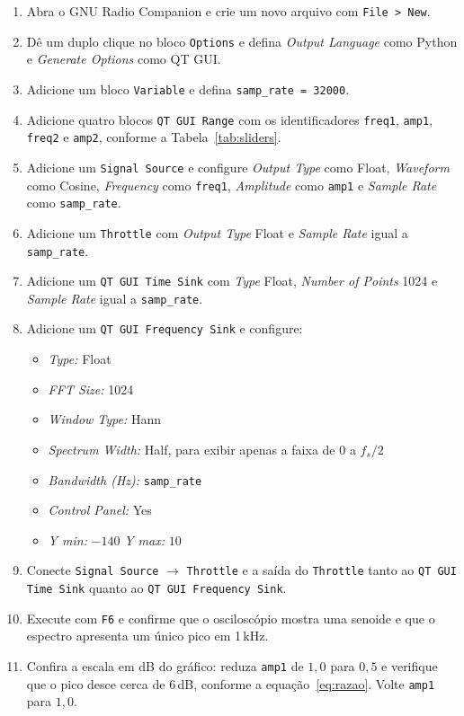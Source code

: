 \documentclass[11pt,a4paper]{article}
\begin{document}
\begin{instrucao}
\begin{enumerate}[label=\arabic*.]
  \item Abra o GNU Radio Companion e crie um novo arquivo com
    \texttt{File > New}.
  \item Dê um duplo clique no bloco \texttt{Options} e defina
    \textit{Output Language} como Python e \textit{Generate Options} como
    QT GUI.
  \item Adicione um bloco \texttt{Variable} e defina
    \texttt{samp\_rate = 32000}.
  \item Adicione quatro blocos \texttt{QT GUI Range} com os identificadores
    \texttt{freq1}, \texttt{amp1}, \texttt{freq2} e \texttt{amp2}, conforme a
    Tabela~\ref{tab:sliders}.
  \item Adicione um \texttt{Signal Source} e configure
    \textit{Output Type} como Float, \textit{Waveform} como Cosine,
    \textit{Frequency} como \texttt{freq1}, \textit{Amplitude} como
    \texttt{amp1} e \textit{Sample Rate} como \texttt{samp\_rate}.
  \item Adicione um \texttt{Throttle} com \textit{Output Type} Float e
    \textit{Sample Rate} igual a \texttt{samp\_rate}.
  \item Adicione um \texttt{QT GUI Time Sink} com \textit{Type} Float,
    \textit{Number of Points} 1024 e \textit{Sample Rate} igual a
    \texttt{samp\_rate}.
  \item Adicione um \texttt{QT GUI Frequency Sink} e configure:
    \begin{itemize}
      \item \textit{Type:} Float
      \item \textit{FFT Size:} 1024
      \item \textit{Window Type:} Hann
      \item \textit{Spectrum Width:} Half, para exibir apenas a faixa de
        $0$ a $f_s/2$
      \item \textit{Bandwidth (Hz):} \texttt{samp\_rate}
      \item \textit{Control Panel:} Yes
      \item \textit{Y min:} $-140$ \quad \textit{Y max:} $10$
    \end{itemize}
  \item Conecte \texttt{Signal Source} $\to$ \texttt{Throttle} e a saída do
    \texttt{Throttle} tanto ao \texttt{QT GUI Time Sink} quanto ao
    \texttt{QT GUI Frequency Sink}.
  \item Execute com \texttt{F6} e confirme que o osciloscópio mostra uma
    senoide e que o espectro apresenta um único pico em 1\,kHz.
  \item Confira a escala em dB do gráfico: reduza \texttt{amp1} de $1{,}0$ para
    $0{,}5$ e verifique que o pico desce cerca de $6$\,dB, conforme a
    equação~\eqref{eq:razao}. Volte \texttt{amp1} para $1{,}0$.
\end{enumerate}
\end{instrucao}
\end{document}
